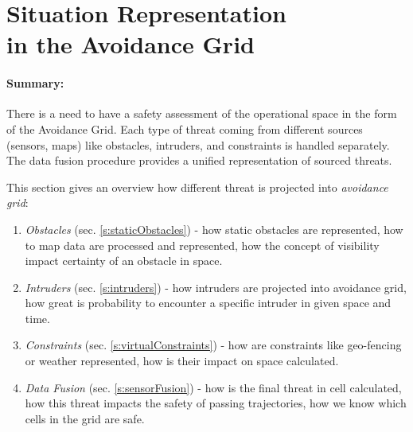 \cleardoublepage
\section[Situation Representation in the Avoidance Grid]{Situation Representation \\in the Avoidance Grid}\label{sec:situationAssessment}

\paragraph{Summary:} There is a need to have a safety assessment of the operational space in the form of the Avoidance Grid. Each type of threat coming from different sources (sensors, maps) like obstacles, intruders, and constraints is handled separately. The data fusion procedure provides a unified representation of sourced threats.  

This section gives an overview how different threat is projected into \emph{avoidance grid}:

\begin{enumerate}
	\item\emph{Obstacles} (sec. \ref{s:staticObstacles}) - how static obstacles are represented, how to map data are processed and represented, how the concept of visibility impact certainty of an obstacle in space.
	
	\item\emph{Intruders} (sec. \ref{s:intruders}) - how intruders are projected into avoidance grid, how great is probability to encounter a specific intruder in given space and time.
	
	\item\emph{Constraints} (sec. \ref{s:virtualConstraints}) - how are constraints like geo-fencing or weather represented, how is their impact on space calculated.
	
	\item\emph{Data Fusion} (sec. \ref{s:sensorFusion}) - how is the final threat in cell calculated, how this threat impacts the safety of passing trajectories, how we know which cells in the grid are safe.
\end{enumerate}